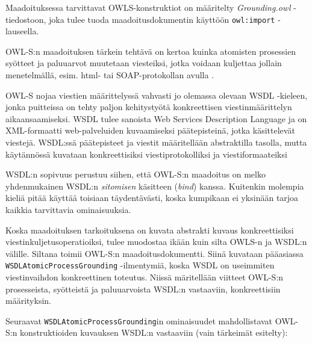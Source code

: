 \documentclass[finnish]{tktltiki2}
\theoremstyle{definition}
\theoremstyle{remark}
\begin{document}
Maadoituksessa tarvittavat OWLS-konstruktiot on määritelty \textit{Grounding.owl} -tiedostoon, joka tulee tuoda maadoitusdokumentin käyttöön \texttt{owl:import} -lauseella.

OWL-S:n maadoituksen tärkein tehtävä on kertoa kuinka atomisten prosessien syötteet ja paluuarvot muutetaan viesteiksi, jotka voidaan kuljettaa jollain menetelmällä, esim. html- tai SOAP-protokollan avulla \cite{OWLS}. 


OWL-S nojaa viestien määrittelyssä vahvasti jo olemassa olevaan WSDL -kieleen, jonka puitteissa on tehty paljon kehitystyötä konkreettisen viestinmäärittelyn aikaansaamiseksi. WSDL tulee sanoista Web Services Description Language ja on XML-formaatti web-palveluiden kuvaamiseksi päätepisteinä, jotka käsittelevät viestejä. WSDL:ssä päätepisteet ja viestit määritellään abstraktilla tasolla, mutta käytännössä kuvataan konkreettisiksi viestiprotokolliksi ja viestiformaateiksi \cite{WSDL}    

WSDL:n sopivuus perustuu siihen, että OWL-S:n maadoitus on melko yhdenmukainen WSDL:n \textit{sitomisen} käsitteen (\textit{bind}) kanssa\cite{OWLS}. Kuitenkin molempia kieliä pitää käyttää toisiaan täydentävästi, koska kumpikaan ei yksinään tarjoa kaikkia tarvittavia ominaisuuksia. 

Koska maadoituksen tarkoituksena on kuvata abstrakti kuvaus konkreettisiksi viestinkuljetusoperatioiksi, tulee muodostaa ikään kuin silta OWLS-n ja WSDL:n välille. Siltana toimii OWL-S:n maadoitusdokumentti. Siinä kuvataan pääasiassa \texttt{WSDLAtomicProcessGrounding} -ilmentymiä, koska WSDL on useimmiten viestinvaihdon konkreettinen toteutus. Niissä märitellään viitteet OWL-S:n  prosesseista, syötteistä ja paluuarvoista WSDL:n vastaaviin, konkreettisiin määrityksin\cite{OWLS}. 

Seuraavat \texttt{WSDLAtomicProcessGrounding}in ominaisuudet mahdollistavat OWL-S:n konstruktioiden kuvauksen WSDL:n vastaaviin (vain tärkeimät esitelty):
\end{document}

